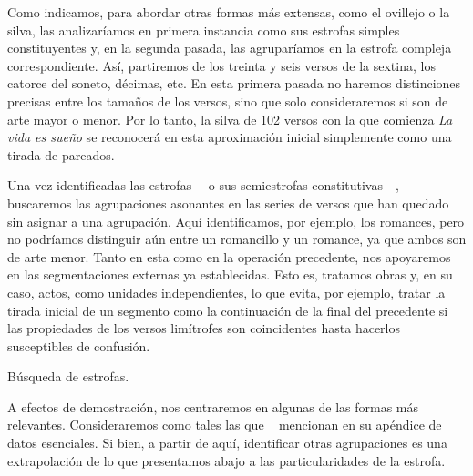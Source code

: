 Como indicamos, para abordar otras formas más extensas, como el ovillejo o la silva, las analizaríamos en primera instancia como sus estrofas simples constituyentes y, en la segunda pasada, las agruparíamos en la estrofa compleja correspondiente. Así, partiremos de los treinta y seis versos de la sextina, los catorce del soneto, décimas, etc. En esta primera pasada no haremos distinciones precisas entre los tamaños de los versos, sino que solo consideraremos si son de arte mayor o menor. Por lo tanto, la silva de 102 versos con la que comienza \textit{La vida es sueño} se reconocerá en esta aproximación inicial simplemente como una tirada de pareados.


Una vez identificadas las estrofas —o sus semiestrofas constitutivas—, buscaremos las agrupaciones asonantes en las series de versos que han quedado sin asignar a una agrupación. Aquí identificamos, por ejemplo, los romances, pero no podríamos distinguir aún entre un romancillo y un romance, ya que ambos son de arte menor. Tanto en esta como en la operación precedente, nos apoyaremos en las segmentaciones externas ya establecidas. Esto es, tratamos obras y, en su caso, actos, como unidades independientes, lo que evita, por ejemplo, tratar la tirada inicial de un segmento como la continuación de la final del precedente si las propiedades de los versos limítrofes son coincidentes hasta hacerlos susceptibles de confusión.


\begin{algorithm}[!ht]
	\caption{Búsqueda de estrofas.}\label{list:stanzas2}
\end{algorithm}

A efectos de demostración, nos centraremos en algunas de las formas más relevantes. Consideraremos como tales las que \citeauthor{morley1968}~\parencite*[627-659]{morley1968} mencionan en su apéndice de datos esenciales. Si bien, a partir de aquí, identificar otras agrupaciones es una extrapolación de lo que presentamos abajo a las particularidades de la estrofa.


